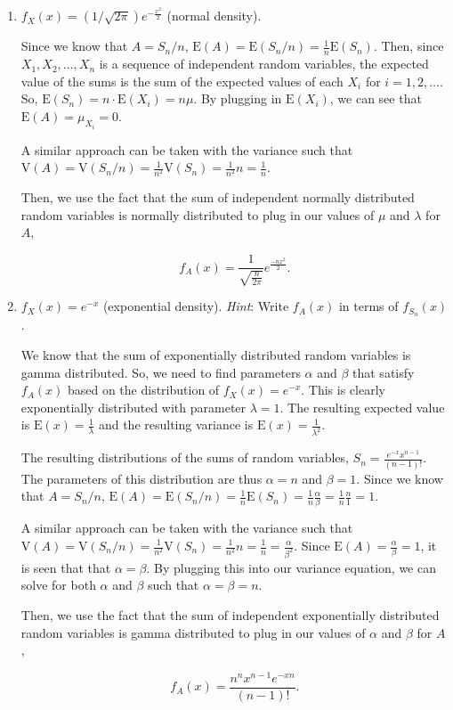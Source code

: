 \documentclass[12pt]{article}
\begin{document}
\begin{enumerate}[label=(\alph*)]
\item $f_X(x) = (1 / \sqrt{2 \pi}) e^{- \frac{x^2}{2}}$ (normal density).

\noindent
Since we know that $A = S_n/n$, $\text{E}(A) = \text{E}(S_n / n) = \frac{1}{n} \text{E}(S_n)$. Then, since $X_1, X_2, . . . , X_n$ is a sequence of independent random variables, the expected value of the sums is the sum of the expected values of each $X_i$ for $i = 1, 2, \ldots $. So, $\text{E}(S_n) = n \cdot \text{E}(X_i) = n \mu$. By plugging in $\text{E}(X_i)$, we can see that $\text{E}(A) = \mu_{X_i} = 0$.

\noindent
A similar approach can be taken with the variance such that $\text{V}(A) = \text{V}(S_n / n) = \frac{1}{n^2} \text{V}(S_n) = \frac{1}{n^2} n = \frac{1}{n}$.

\noindent
Then, we use the fact that the sum of independent normally distributed random variables is normally distributed to plug in our values of $\mu$ and $\lambda$ for $A$,

\begin{equation*}
f_A(x) = \frac{1}{\sqrt{\frac{n}{2 \pi}}} e^{\frac{-n x^2}{2}}.
\end{equation*}

\item $f_X(x) = e^{- x}$ (exponential density). \textit{Hint}: Write $f_A(x)$ in terms of $f_{S_n}(x)$.

\noindent
We know that the sum of exponentially distributed random variables is gamma distributed. So, we need to find parameters $\alpha$ and $\beta$ that satisfy $f_A(x)$ based on the distribution of $f_X(x) = e^{- x}$. This is clearly exponentially distributed with parameter $\lambda = 1$. The resulting expected value is $\text{E}(x) = \frac{1}{\lambda}$ and the resulting variance is $\text{E}(x) = \frac{1}{\lambda^2}$. 

\noindent
The resulting distributions of the sums of random variables, $S_n = \frac{e^{-x} x^{n-1}}{(n-1)!}$. The parameters of this distribution are thus $\alpha = n$ and $\beta = 1$. Since we know that $A = S_n/n$, $\text{E}(A) = \text{E}(S_n / n) = \frac{1}{n} \text{E}(S_n) = \frac{1}{n} \frac{\alpha}{\beta} = \frac{1}{n} \frac{n}{1} = 1$.

\noindent
A similar approach can be taken with the variance such that $\text{V}(A) = \text{V}(S_n / n) = \frac{1}{n^2} \text{V}(S_n) = \frac{1}{n^2} n = \frac{1}{n} = \frac{\alpha}{\beta^2}$. Since $\text{E}(A) = \frac{\alpha}{\beta} = 1$, it is seen that that $\alpha = \beta$. By plugging this into our variance equation, we can solve for both $\alpha$ and $\beta$ such that $\alpha = \beta = n$.

\noindent
Then, we use the fact that the sum of independent exponentially distributed random variables is gamma distributed to plug in our values of $\alpha$ and $\beta$ for $A$,

\begin{equation*}
f_A(x) = \frac{n^n x^{n-1} e^{-xn}}{(n-1)!}.
\end{equation*}

\end{enumerate}
\end{document}
